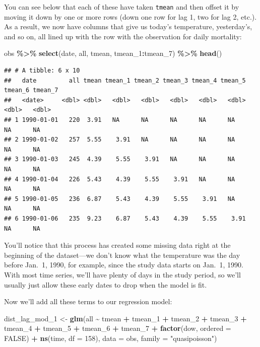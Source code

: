 \documentclass[
]{book}
\newenvironment{Shaded}{\begin{snugshade}}{\end{snugshade}}
\newcommand{\AttributeTok}[1]{\textcolor[rgb]{0.13,0.29,0.53}{#1}}
\newcommand{\ConstantTok}[1]{\textcolor[rgb]{0.56,0.35,0.01}{#1}}
\newcommand{\DecValTok}[1]{\textcolor[rgb]{0.00,0.00,0.81}{#1}}
\newcommand{\FunctionTok}[1]{\textcolor[rgb]{0.13,0.29,0.53}{\textbf{#1}}}
\newcommand{\NormalTok}[1]{#1}
\newcommand{\OtherTok}[1]{\textcolor[rgb]{0.56,0.35,0.01}{#1}}
\newcommand{\SpecialCharTok}[1]{\textcolor[rgb]{0.81,0.36,0.00}{\textbf{#1}}}
\newcommand{\StringTok}[1]{\textcolor[rgb]{0.31,0.60,0.02}{#1}}
\begin{document}
You can see below that each of these have taken \texttt{tmean} and then offset it by moving it down
by one or more rows (down one row for lag 1, two for lag 2, etc.). As a result, we now have
columns that give us today's temperature, yesterday's, and so on, all lined up with the
row with the observation for daily mortality:

\begin{Shaded}
\begin{Highlighting}[]
\NormalTok{obs }\SpecialCharTok{\%\textgreater{}\%} 
  \FunctionTok{select}\NormalTok{(date, all, tmean, tmean\_1}\SpecialCharTok{:}\NormalTok{tmean\_7) }\SpecialCharTok{\%\textgreater{}\%} 
  \FunctionTok{head}\NormalTok{()}
\end{Highlighting}
\end{Shaded}

\begin{verbatim}
## # A tibble: 6 x 10
##   date         all tmean tmean_1 tmean_2 tmean_3 tmean_4 tmean_5 tmean_6 tmean_7
##   <date>     <dbl> <dbl>   <dbl>   <dbl>   <dbl>   <dbl>   <dbl>   <dbl>   <dbl>
## 1 1990-01-01   220  3.91   NA      NA      NA      NA      NA         NA      NA
## 2 1990-01-02   257  5.55    3.91   NA      NA      NA      NA         NA      NA
## 3 1990-01-03   245  4.39    5.55    3.91   NA      NA      NA         NA      NA
## 4 1990-01-04   226  5.43    4.39    5.55    3.91   NA      NA         NA      NA
## 5 1990-01-05   236  6.87    5.43    4.39    5.55    3.91   NA         NA      NA
## 6 1990-01-06   235  9.23    6.87    5.43    4.39    5.55    3.91      NA      NA
\end{verbatim}

You'll notice that this process has created some missing data right at the beginning of the
dataset---we don't know what the temperature was the day before Jan.~1, 1990, for example,
since the study data starts on Jan.~1, 1990. With most time series, we'll have plenty of
days in the study period, so we'll usually just allow these early dates to drop when the
model is fit.

Now we'll add all these terms to our regression model:

\begin{Shaded}
\begin{Highlighting}[]
\NormalTok{dist\_lag\_mod\_1 }\OtherTok{\textless{}{-}} \FunctionTok{glm}\NormalTok{(all }\SpecialCharTok{\textasciitilde{}}\NormalTok{ tmean }\SpecialCharTok{+}\NormalTok{ tmean\_1 }\SpecialCharTok{+}\NormalTok{ tmean\_2 }\SpecialCharTok{+}\NormalTok{ tmean\_3 }\SpecialCharTok{+}\NormalTok{ tmean\_4 }\SpecialCharTok{+} 
\NormalTok{                        tmean\_5 }\SpecialCharTok{+}\NormalTok{ tmean\_6 }\SpecialCharTok{+}\NormalTok{ tmean\_7 }\SpecialCharTok{+} 
                        \FunctionTok{factor}\NormalTok{(dow, }\AttributeTok{ordered =} \ConstantTok{FALSE}\NormalTok{) }\SpecialCharTok{+}
                          \FunctionTok{ns}\NormalTok{(time, }\AttributeTok{df =} \DecValTok{158}\NormalTok{), }
                        \AttributeTok{data =}\NormalTok{ obs, }\AttributeTok{family =} \StringTok{"quasipoisson"}\NormalTok{)}
\end{Highlighting}
\end{Shaded}
\end{document}
